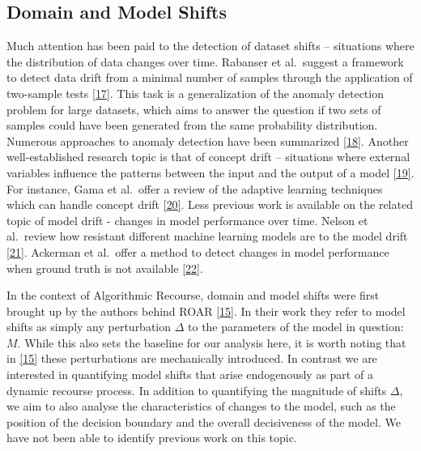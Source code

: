 \documentclass[
  conference]{IEEEtran}
\begin{document}
\hypertarget{sec-related-shifts}{%
\subsection{Domain and Model Shifts}\label{sec-related-shifts}}

Much attention has been paid to the detection of dataset shifts --
situations where the distribution of data changes over time. Rabanser et
al.~suggest a framework to detect data drift from a minimal number of
samples through the application of two-sample tests
\protect\hyperlink{ref-rabanser2019failing}{{[}17{]}}. This task is a
generalization of the anomaly detection problem for large datasets,
which aims to answer the question if two sets of samples could have been
generated from the same probability distribution. Numerous approaches to
anomaly detection have been summarized
\protect\hyperlink{ref-chandola2009anomaly}{{[}18{]}}. Another
well-established research topic is that of concept drift -- situations
where external variables influence the patterns between the input and
the output of a model
\protect\hyperlink{ref-widmer1996learning}{{[}19{]}}. For instance, Gama
et al.~offer a review of the adaptive learning techniques which can
handle concept drift \protect\hyperlink{ref-gama2014survey}{{[}20{]}}.
Less previous work is available on the related topic of model drift -
changes in model performance over time. Nelson et al.~review how
resistant different machine learning models are to the model drift
\protect\hyperlink{ref-nelson2015evaluating}{{[}21{]}}. Ackerman et
al.~offer a method to detect changes in model performance when ground
truth is not available
\protect\hyperlink{ref-ackerman2021machine}{{[}22{]}}.

In the context of Algorithmic Recourse, domain and model shifts were
first brought up by the authors behind ROAR
\protect\hyperlink{ref-upadhyay2021towards}{{[}15{]}}. In their work
they refer to model shifts as simply any perturbation \(\Delta\) to the
parameters of the model in question: \(M\). While this also sets the
baseline for our analysis here, it is worth noting that in
\protect\hyperlink{ref-upadhyay2021towards}{{[}15{]}} these
perturbations are mechanically introduced. In contrast we are interested
in quantifying model shifts that arise endogenously as part of a dynamic
recourse process. In addition to quantifying the magnitude of shifts
\(\Delta\), we aim to also analyse the characteristics of changes to the
model, such as the position of the decision boundary and the overall
decisiveness of the model. We have not been able to identify previous
work on this topic.
\end{document}
